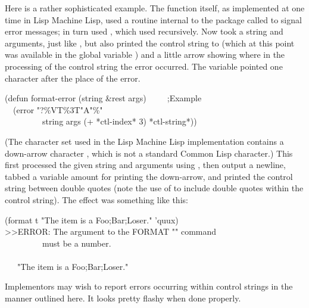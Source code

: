 \begin{flushdesc}
Here is a rather sophisticated example.
The  function itself,
as implemented at one time in Lisp Machine Lisp,
used a routine internal to the  package called  to
signal error messages;  in turn used , which used
 recursively.  Now  took a string and
arguments, just like , but also printed the control string
to  (which at this point was available
in the global variable ) and a little
arrow showing where in the processing of the control string the error
occurred.  The variable  pointed one character after the
place of the error.
\begin{lisp}
(defun format-error (string \&rest args)~~~~~;\textrm{Example} \\
~~(error {\false} "{\Xtilde}?{\Xtilde}\%{\Xtilde}V{\Xatsign}T{\Xarrowdown}{\Xtilde}\%{\Xtilde}3{\Xatsign}T{\Xbackslash}"{\Xtilde}A{\Xbackslash}"{\Xtilde}\%" \\
~~~~~~~~~string args (+ *ctl-index* 3) *ctl-string*))
\end{lisp}
(The character set used in the Lisp Machine Lisp implementation contains a
down-arrow character \cd{\Xarrowdown}, which is not a standard Common Lisp
character.)  This first processed the given string and arguments using
, then output a newline, tabbed a variable amount for
printing the down-arrow, and printed the control string between
double quotes (note the use of  to include double quotes within
the control string).  The effect was something like this:
\begin{lisp}
(format t "The item is a {\Xtilde}{\Xlbracket}Foo{\Xtilde};Bar{\Xtilde};Loser{\Xtilde}{\Xrbracket}." 'quux) \\
>>ERROR: The argument to the FORMAT "{\Xtilde}{\Xlbracket}" command  \\
~~~~~~~~~must be a number. \\
~~~~~~~~~~~~~~~~~~~{\Xarrowdown} \\
~~~"The item is a {\Xtilde}{\Xlbracket}Foo{\Xtilde};Bar{\Xtilde};Loser{\Xtilde}{\Xrbracket}."
\end{lisp}

\beforenoterule
\begin{implementation}
Implementors may wish to report errors occurring
within  control strings in the manner outlined here.
It looks pretty flashy when done properly.
\end{implementation}
\afternoterule
\end{flushdesc}

